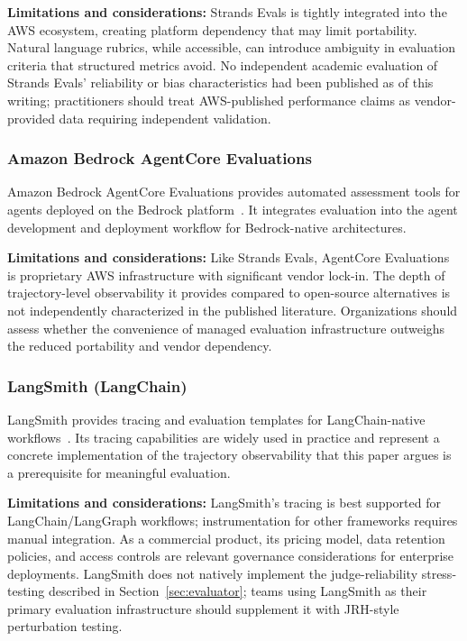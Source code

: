 \textbf{Limitations and considerations:} Strands Evals is tightly integrated into the AWS ecosystem, creating platform dependency that may limit portability. Natural language rubrics, while accessible, can introduce ambiguity in evaluation criteria that structured metrics avoid. No independent academic evaluation of Strands Evals' reliability or bias characteristics had been published as of this writing; practitioners should treat AWS-published performance claims as vendor-provided data requiring independent validation.

\subsubsection{Amazon Bedrock AgentCore Evaluations}

Amazon Bedrock AgentCore Evaluations provides automated assessment tools for agents deployed on the Bedrock platform~\citep{aws_evaluating_agents}. It integrates evaluation into the agent development and deployment workflow for Bedrock-native architectures.

\textbf{Limitations and considerations:} Like Strands Evals, AgentCore Evaluations is proprietary AWS infrastructure with significant vendor lock-in. The depth of trajectory-level observability it provides compared to open-source alternatives is not independently characterized in the published literature. Organizations should assess whether the convenience of managed evaluation infrastructure outweighs the reduced portability and vendor dependency.

\subsubsection{LangSmith (LangChain)}

LangSmith provides tracing and evaluation templates for LangChain-native workflows~\citep{langsmith_primary}. Its tracing capabilities are widely used in practice and represent a concrete implementation of the trajectory observability that this paper argues is a prerequisite for meaningful evaluation.

\textbf{Limitations and considerations:} LangSmith's tracing is best supported for LangChain/LangGraph workflows; instrumentation for other frameworks requires manual integration. As a commercial product, its pricing model, data retention policies, and access controls are relevant governance considerations for enterprise deployments. LangSmith does not natively implement the judge-reliability stress-testing described in Section~\ref{sec:evaluator}; teams using LangSmith as their primary evaluation infrastructure should supplement it with JRH-style perturbation testing.

